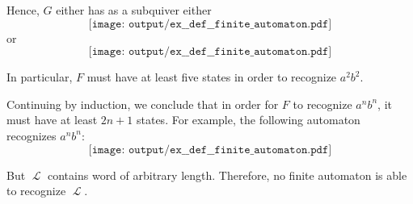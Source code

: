 \begin{example}
\begin{thmenum}
    Hence, \( G \) either has as a subquiver either
    \begin{equation*}
      \texttt{[image: output/ex\_\_def\_\_finite\_automaton.pdf]}
    \end{equation*}
    or
    \begin{equation*}
      \texttt{[image: output/ex\_\_def\_\_finite\_automaton.pdf]}
    \end{equation*}

    In particular, \( F \) must have at least five states in order to recognize \( a^2 b^2 \).

    Continuing by induction, we conclude that in order for \( F \) to recognize \( a^n b^n \), it must have at least \( 2n + 1 \) states. For example, the following automaton recognizes \( a^n b^n \):
    \begin{equation*}
      \texttt{[image: output/ex\_\_def\_\_finite\_automaton.pdf]}
    \end{equation*}

    But \( \mscrL \) contains word of arbitrary length. Therefore, no finite automaton is able to recognize \( \mscrL \).
  \end{thmenum}
\end{example}

